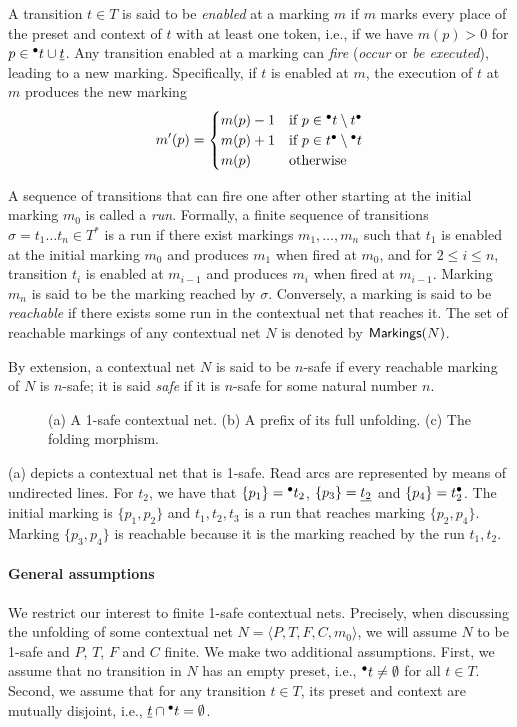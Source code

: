 \documentclass[11pt,a4paper]{article}
\begin{document}
A transition $t \in T$ is said to be \emph{enabled} at a marking $m$ if $m$
marks every place of the preset and context of $t$ with at least one token,
i.e.,  if we have $m(p) > 0$ for $p \in {}^\bullet t \cup \underline{t}$.  Any transition
enabled at a marking can \emph{fire} (\emph{occur} or \emph{be executed}),
leading to a new marking.  Specifically, if $t$ is enabled at $m$, the
execution of $t$ at $m$ produces the new marking $$m'(p) = 
\begin{cases}
m(p) - 1 & \mbox{if } p \in {}^\bullet t \setminus t^\bullet \\
m(p) + 1 & \mbox{if } p \in t^\bullet \setminus {}^\bullet t \\
m(p) & \mbox{otherwise}
\end{cases}$$

A sequence of transitions that can fire one after other starting at the
initial marking $m_0$ is called a \emph{run}.  Formally, a finite sequence of
transitions $\sigma = t_1 \ldots t_n \in T^*$ is a run if there exist markings
$m_1, \ldots, m_n$ such that $t_1$ is enabled at the initial marking $m_0$ and
produces $m_1$ when fired at $m_0$, and for $2 \le i \le n$, transition $t_i$
is enabled at $m_{i-1}$ and produces $m_i$ when fired at $m_{i-1}$.  Marking
$m_n$ is said to be the marking reached by $\sigma$.  Conversely, a marking is
said to be \emph{reachable} if there exists some run in the contextual net that
reaches it.  The set of reachable markings of any contextual net $N$ is denoted
by $\mathsf{ Markings }{(N)}$.

By extension, a contextual net $N$ is said to be $n$-safe if every reachable
marking of $N$ is $n$-safe; it is said \emph{safe} if it is $n$-safe for some
natural number $n$.

\begin{figure}
\caption{(a) A 1-safe contextual net. (b) A prefix of its full unfolding. (c)
The folding morphism.}
\label{fig:a.1safe}
\end{figure}

 (a) depicts a contextual net that is 1-safe.  Read arcs are
represented by means of undirected lines.  For $t_2$, we have that $\{p_1\} =
{}^\bullet t_2$, $\{p_3\} = \underline{t_2}$ and $\{p_4\} = t_2^\bullet$.  The initial
marking is $\{p_1, p_2\}$ and $t_1, t_2, t_3$ is a run that reaches marking
$\{p_2, p_4\}$.  Marking $\{p_3, p_4\}$ is reachable because it is the marking
reached by the run $t_1, t_2$.

\paragraph{General assumptions}  We restrict our interest to finite 1-safe
contextual nets.  Precisely, when discussing the unfolding of some contextual
net $N = \langle P, T, F, C, m_0 \rangle$, we will assume $N$ to be 1-safe and
$P$, $T$, $F$ and $C$ finite.  We make two additional assumptions.  First, we
assume that no transition in $N$ has an empty preset, i.e., ${}^\bullet t \ne
\emptyset$ for all $t \in T$.  Second, we assume that for any transition $t \in
T$, its preset and context are mutually disjoint, i.e., $\underline{t} \cap {}^\bullet t =
\emptyset$.
\end{document}
